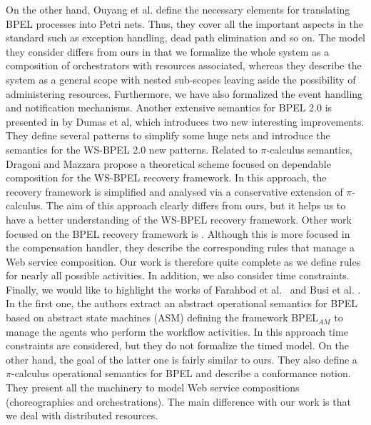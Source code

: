 On the other hand, Ouyang et al. \cite{Ouyang:2007} define the necessary elements for translating BPEL processes into Petri nets. Thus, they
cover all the important aspects in the standard such as exception handling, dead path elimination and so on. The model they consider differs from ours in that we formalize the whole
system as a composition of orchestrators with resources associated, whereas they describe the system as a general scope with nested sub-scopes leaving aside the possibility of administering resources. Furthermore, we have also formalized the event handling and notification mechanisms.  
Another extensive semantics for BPEL 2.0
is presented in \cite{Dumas:2008} by Dumas et al, which introduces two new interesting improvements. They define several patterns to simplify some huge nets and introduce the semantics for the WS-BPEL 2.0 new patterns. Related to $\pi$-calculus semantics, Dragoni and Mazzara \cite{Dragoni:2009} 
propose a theoretical scheme focused on dependable composition for the  WS-BPEL recovery
framework. In this approach, the recovery framework is simplified
and analysed via a conservative extension of $\pi$-calculus. The
aim of this approach clearly differs from ours, but it helps us to have
a better understanding of the WS-BPEL recovery framework. Other work focused on the BPEL
recovery framework is \cite{Qiu:2005}. Although this is more focused in the compensation handler, they describe the corresponding rules
that manage a Web service composition. Our work is therefore quite complete as we define rules for nearly all possible activities. In addition, we also consider time constraints. Finally, we would like to highlight the works of Farahbod et al.~\cite{Farahbod:2005} and Busi et al. \cite{Busi:2005}. In the first one, the authors extract an abstract operational semantics for BPEL based on abstract state machines (ASM) defining the framework BPEL$_{AM}$ to manage the agents who perform the workflow activities. In this approach time constraints are considered, but they do not formalize the timed model. On the other hand, the goal of the latter one is fairly similar to ours. They also define a $\pi$-calculus operational semantics for BPEL and describe a conformance notion. They present all the machinery to model Web service compositions (choreographies and orchestrations). The main difference with our work is that we deal with distributed resources. %

